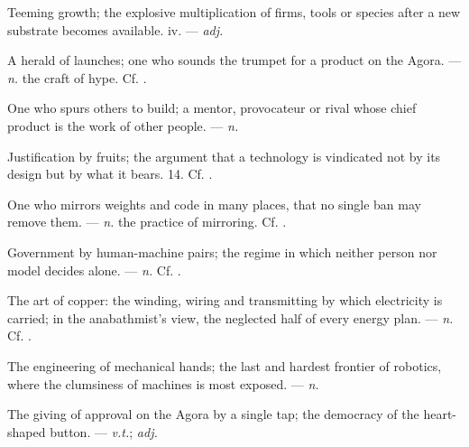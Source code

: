  Teeming growth; the explosive multiplication of firms, tools or species after a new substrate becomes available.   iv. ---  \textit{adj.}

 A herald of launches; one who sounds the trumpet for a product on the Agora. ---  \textit{n.} the craft of hype. Cf. .

 One who spurs others to build; a mentor, provocateur or rival whose chief product is the work of other people.  ---  \textit{n.}

 Justification by fruits; the argument that a technology is vindicated not by its design but by what it bears.   14. Cf. .

 One who mirrors weights and code in many places, that no single ban may remove them. ---  \textit{n.} the practice of mirroring. Cf. .

 Government by human-machine pairs; the regime in which neither person nor model decides alone. ---  \textit{n.} Cf. .

 The art of copper: the winding, wiring and transmitting by which electricity is carried; in the anabathmist's view, the neglected half of every energy plan.  ---  \textit{n.} Cf. .

 The engineering of mechanical hands; the last and hardest frontier of robotics, where the clumsiness of machines is most exposed. ---  \textit{n.}

 The giving of approval on the Agora by a single tap; the democracy of the heart-shaped button. ---  \textit{v.t.};  \textit{adj.}

